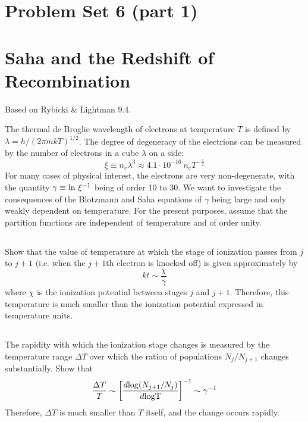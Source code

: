 \documentclass[11pt]{article}
\begin{document}
\pagestyle{empty}
\parindent=0pt

\section*{\centering Problem Set 6 (part 1)}

\section{Saha and the Redshift of Recombination}

Based on Rybicki \& Lightman 9.4.

The thermal de Broglie wavelength of electrons at temperature $T$ is
defined by $\lambda=h/(2\pi mkT)^{1/2}$.  The degree of degeneracy of
the electrions can be measured by the number of electrons in a cube $\lambda$
on a side:
\begin{equation}
\xi\equiv n_e\lambda^3\approx 4.1\cdot10^{-16}~n_e T^{-\frac32}
\end{equation}
For many cases of physical interest, the electrons are very non-degenerate,
with the quantity $\gamma\equiv{\rm ln}~\xi^{-1}$ being of order 10 to 30.
We want to investigate the consequences of the Blotzmann and Saha equations of
$\gamma$ being large and only weakly dependent on temperature.  For the present
purposes, assume that the partition functions are independent of temperature
and of order unity.

\subsection{}
\label{sec:p1a}
Show that the value of temperature at which the stage of ionization passes from
$j$ to $j+1$ (i.e. when the $j+1$th electron is knocked off) is given approximately by
\begin{equation}
kt\sim\frac\chi\gamma
\end{equation}
where $\chi$ is the ionization potential between stages $j$ and $j+1$.  Therefore,
this temperature is much smaller than the ionization potential expressed in
temperature units.

\subsection{}
The rapidity with which the ionization stage changes is measured by the
temperature range $\Delta T$ over which the ration of populations 
$N_j/N_{j+1}$ changes substantially.  Show that
\begin{equation}
\frac{\Delta T}{T}\sim\left[\frac{d{\rm log}(N_{j+1}/N_j)}{d\rm{log} T}\right]^{-1}\sim\gamma^{-1}
\end{equation}
Therefore, $\Delta T$ is much smaller than $T$ itself, and the change occurs rapidly.
\end{document}
